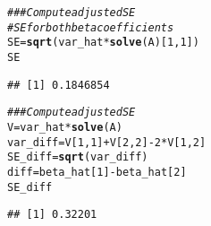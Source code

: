 \documentclass[11pt]{article}\usepackage[]{graphicx}\usepackage[]{color}
\makeatletter
\newcommand{\hlnum}[1]{\textcolor[rgb]{0.686,0.059,0.569}{#1}}%
\newcommand{\hlcom}[1]{\textcolor[rgb]{0.678,0.584,0.686}{\textit{#1}}}%
\newcommand{\hlopt}[1]{\textcolor[rgb]{0,0,0}{#1}}%
\newcommand{\hlstd}[1]{\textcolor[rgb]{0.345,0.345,0.345}{#1}}%
\newcommand{\hlkwb}[1]{\textcolor[rgb]{0.69,0.353,0.396}{#1}}%
\newcommand{\hlkwd}[1]{\textcolor[rgb]{0.737,0.353,0.396}{\textbf{#1}}}%
\newenvironment{kframe}{%
 \def\at@end@of@kframe{}%
 \ifinner\ifhmode%
  \def\at@end@of@kframe{\end{minipage}}%
  \begin{minipage}{\columnwidth}%
 \fi\fi%
 \def\FrameCommand##1{\hskip\@totalleftmargin \hskip-\fboxsep
 \colorbox{shadecolor}{##1}\hskip-\fboxsep
     \hskip-\linewidth \hskip-\@totalleftmargin \hskip\columnwidth}%
 \MakeFramed {\advance\hsize-\width
   \@totalleftmargin\z@ \linewidth\hsize
   \@setminipage}}%
 {\par\unskip\endMakeFramed%
 \at@end@of@kframe}
\newenvironment{knitrout}{}{} %
\makeatother
\begin{document}
\begin{knitrout}
\color{fgcolor}\begin{kframe}
\begin{alltt}
\hlcom{## # Compute adjusted SE}
\hlcom{# SE for both beta coefficients }
\hlstd{SE} \hlkwb{=} \hlkwd{sqrt}\hlstd{(var_hat}\hlopt{*}\hlkwd{solve}\hlstd{(A)[}\hlnum{1}\hlstd{,}\hlnum{1}\hlstd{])}
\hlstd{SE}
\end{alltt}
\begin{verbatim}
## [1] 0.1846854
\end{verbatim}
\begin{alltt}
\hlcom{## # Compute adjusted SE}
\hlstd{V} \hlkwb{=} \hlstd{var_hat}\hlopt{*}\hlkwd{solve}\hlstd{(A)}
\hlstd{var_diff} \hlkwb{=} \hlstd{V[}\hlnum{1}\hlstd{,}\hlnum{1}\hlstd{]}\hlopt{+}\hlstd{V[}\hlnum{2}\hlstd{,}\hlnum{2}\hlstd{]}\hlopt{-}\hlnum{2}\hlopt{*}\hlstd{V[}\hlnum{1}\hlstd{,}\hlnum{2}\hlstd{]}
\hlstd{SE_diff} \hlkwb{=} \hlkwd{sqrt}\hlstd{(var_diff)}
\hlstd{diff} \hlkwb{=} \hlstd{beta_hat[}\hlnum{1}\hlstd{]}\hlopt{-}\hlstd{beta_hat[}\hlnum{2}\hlstd{]}
\hlstd{SE_diff}
\end{alltt}
\begin{verbatim}
## [1] 0.32201
\end{verbatim}
\end{kframe}
\end{knitrout}
\end{document}
